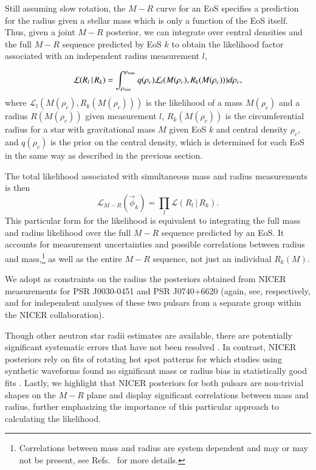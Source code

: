 \documentclass[aps,prd,nofootinbib,tightenlines,notitlepage,floatfix,superscriptaddress,showkeys,twocolumn]{revtex4-1}
\begin{document}
Still assuming slow rotation, the $M-R$ curve for an EoS specifies a prediction for the radius given a stellar mass which is only a function of the EoS itself. Thus, given a joint $M-R$ posterior, we can integrate over central densities and the full $M-R$ sequence predicted by EoS $k$ to obtain the likelihood factor associated with an independent radius measurement $l$,

\begin{equation}
     \mathcal{L}(R_l \, | \, R_k) = \int_{\rho_{\rm min}}^{\rho_{\rm max}} q(\rho_c)\mathcal{L}_l(M(\rho_c), R_k(M(\rho_c)))d\rho_c,
\end{equation}
where $\mathcal{L}_l(M(\rho_c), R_k(M(\rho_c)))$ is the likelihood of a mass $M(\rho_c)$ and a radius $R(M(\rho_c))$ given measurement $l$, $R_k(M(\rho_c))$ is the circumferential radius for a star with gravitational mass $M$ given EoS $k$ and central density $\rho_c$, and $q(\rho_c)$ is the prior on the central density, which is determined for each EoS in the same way as described in the previous section. 

The total likelihood associated with simultaneous mass and radius measurements is then
\begin{equation}\label{eq:NICERlikelihood}
    \mathcal{L}_{M-R}(\vec{\phi}_k) = \prod_l \mathcal{L}(R_l \, | \, R_k).
\end{equation}
This particular form for the likelihood is equivalent to integrating the full mass and radius likelihood over the full $M-R$ sequence predicted by an EoS. It accounts for measurement uncertainties and possible correlations between radius and mass,\footnote{Correlations between mass and radius are system dependent and may or may not be present, see Refs.~\cite{lo2013determining,miller2015determining} for more details. } as well as the entire $M-R$ sequence, not just an individual $R_k(M)$. 

We adopt as constraints on the radius the posteriors obtained from NICER measurements for  PSR J0030-0451 \cite{Miller:2019cac} and PSR J0740+6620 \cite{Miller:2021qha} (again, see, respectively, \cite{Riley:2019yda} and \cite{Riley:2021pdl} for independent analyses of these two pulsars from a separate group within the NICER collaboration). 

Though other neutron star radii estimates are available, there are potentially significant systematic errors that have not been resolved \cite{Miller:2013tca,Miller:2016pom}. In contrast, NICER posteriors rely on fits of rotating hot spot patterns for which studies using synthetic waveforms found no significant mass or radius bias in statistically good fits \cite{miller2015determining,lo2013determining}. Lastly, we highlight that NICER posteriors for both pulsars are non-trivial shapes on the $M-R$ plane and display significant correlations between mass and radius, further emphasizing the importance of this particular approach to calculating the likelihood. 
\end{document}
